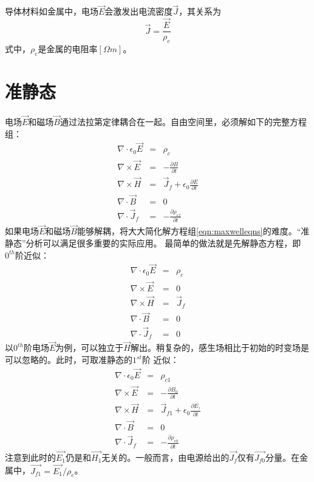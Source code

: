 导体材料如金属中，电场$\vec{E}$会激发出电流密度$\vec{J}$，其关系为
\begin{equation}\label{eqn:ohmlaw}
  \vec{J}=\frac{\vec{E}}{\rho_e}
\end{equation}
式中，$\rho_e$是金属的电阻率$[\Omega m]$。

\section{准静态}
电场$\vec{E}$和磁场$\vec{B}$通过法拉第定律耦合在一起。自由空间里，必须解如下的完整方程组：
\begin{eqnarray}\label{eqn:maxwelleqns}
\nabla \cdot \epsilon_0\vec{E} &=&\rho_c \nonumber \\
\nabla \times \vec{E} &=&-\frac{\partial{B}}{\partial{t}} \nonumber \\
\nabla \times \vec{H} &=&\vec{J}_f+\epsilon_0 \frac{\partial{E}}{\partial{t}} \nonumber \\
\nabla \cdot \vec{B} &=&0 \nonumber \\
\nabla \cdot \vec{J}_f &=&-\frac{\partial{\rho_{cf}}}{\partial{t}}
\end{eqnarray}
如果电场$\vec{E}$和磁场$\vec{B}$能够解耦，将大大简化解方程组\ref{eqn:maxwelleqns}的难度。“准静态”分析可以满足很多重要的实际应用。
最简单的做法就是先解静态方程，即$0^{th}$阶近似：
\begin{eqnarray}\label{eqn:maxwelleqns 0th}
\nabla \cdot \epsilon_0\vec{E} &=&\rho_c \nonumber \\
\nabla \times \vec{E} &=&0 \nonumber \\
\nabla \times \vec{H} &=&\vec{J}_f \nonumber \\
\nabla \cdot \vec{B} &=&0 \nonumber \\
\nabla \cdot \vec{J}_f &=&0
\end{eqnarray}
以$0^{th}$阶电场$\vec{E}$为例，可以独立于$\vec{H}$解出。稍复杂的，感生场相比于初始的时变场是可以忽略的。此时，可取准静态的$1^{st}$阶
近似：
\begin{eqnarray}\label{eqn:maxwelleqns 1th}
\nabla \cdot \epsilon_0\vec{E} &=&\rho_{c1} \nonumber \\
\nabla \times \vec{E} &=&-\frac{\partial{B_0}}{\partial{t}} \nonumber \\
\nabla \times \vec{H} &=&\vec{J}_{f1}+\epsilon_0 \frac{\partial{E_)}}{\partial{t}} \nonumber \\
\nabla \cdot \vec{B} &=&0 \nonumber \\
\nabla \cdot \vec{J}_f &=&-\frac{\partial{\rho_{c0}}}{\partial{t}}
\end{eqnarray}
注意到此时的$\vec{E_1}$仍是和$\vec{H_1}$无关的。一般而言，由电源给出的$\vec{J_f}$仅有$\vec{J_{f0}}$分量。在金属中，$\vec{J_{f1}}=\vec{E_1}/\rho_e$。

